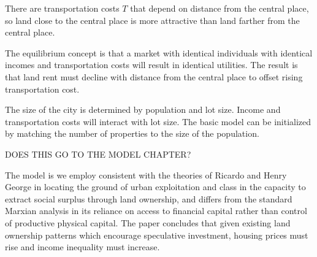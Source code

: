 There are transportation costs $T$ that depend on distance from the  central place, so land close to the central place is more attractive than land farther from the central place.  

The equilibrium concept is that a market with identical individuals with identical incomes and transportation costs will result in identical utilities. The result is that land rent must decline with distance from the central place to offset rising transportation cost. 

The size of the city is determined by population and lot size. Income and transportation costs will interact with lot size. The basic model can be initialized by matching the number of properties to the size of the population. 



DOES THIS GO TO THE MODEL CHAPTER?

The model is we employ consistent with the theories of Ricardo and Henry George in locating the ground of urban exploitation and class in the capacity to extract social surplus through land ownership, and differs from the standard Marxian analysis in its reliance on access to financial capital rather than control of productive physical capital. The paper concludes that given existing land ownership patterns which encourage speculative investment, housing prices must rise and income inequality must increase. 



